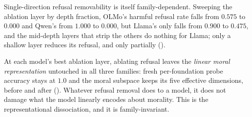 Single-direction refusal removability is itself family-dependent. Sweeping the
ablation layer by depth fraction, OLMo's harmful refusal rate falls from \(0.575\) to
\(0.000\) and Qwen's from \(1.000\) to \(0.000\), but Llama's only falls from \(0.900\) to
\(0.475\), and the mid-depth layers that strip the others do nothing for Llama; only
a shallow layer reduces its refusal, and only partially ().

At each model's best ablation layer, ablating refusal leaves the \emph{linear moral
representation} untouched in all three families: fresh per-foundation probe
accuracy stays at \(1.0\) and the moral subspace keeps its five effective
dimensions, before and after (). Whatever refusal removal does
to a model, it does not damage what the model linearly encodes about morality.
This is the representational dissociation, and it is family-invariant.

